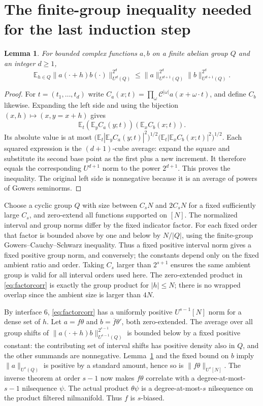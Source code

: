 \documentclass[11pt]{article}
\newtheorem{lemma}[theorem]{Lemma}
\newcommand{\E}{\mathbb E}
\begin{document}
\section{The finite-group inequality needed for the last induction step}

\begin{lemma}\label{lem:CS}
For bounded complex functions $a,b$ on a finite abelian group $Q$ and an
integer $d\geq1$,
\[
 \E_{h\in Q}\|a(\cdot+h)b(\cdot)\|_{U^d(Q)}^{2^d}
 \leq
 \|a\|_{U^{d+1}(Q)}^{2^d}
 \|b\|_{U^{d+1}(Q)}^{2^d}.
\]
\end{lemma}
\begin{proof}
For $t=(t_1,\ldots,t_d)$ write
$C_a(x;t)=\prod_\omega\mathcal C^{|\omega|}a(x+\omega\cdot t)$,
and define $C_b$ likewise. Expanding the left side and using the bijection
$(x,h)\mapsto(x,y=x+h)$ gives
\[
 \E_t(\E_y C_a(y;t))(\E_x C_b(x;t)).
\]
Its absolute value is at most
$\bigl(\E_t|\E_yC_a(y;t)|^2\bigr)^{1/2}
 \bigl(\E_t|\E_xC_b(x;t)|^2\bigr)^{1/2}$.
Each squared expression is the $(d+1)$-cube average: expand the square
and substitute its second base point as the first plus a new increment.
It therefore equals the corresponding $U^{d+1}$ norm to the power
$2^{d+1}$. This proves the inequality. The original left side is
nonnegative because it is an average of powers of Gowers seminorms.
\end{proof}

Choose a cyclic group $Q$ with size between $C_sN$ and $2C_sN$ for a fixed
sufficiently large $C_s$, and zero-extend all functions supported on $[N]$.
The normalized interval and group norms differ by the fixed indicator
factor. For each fixed order that factor is bounded above by one and below
by $N/|Q|$, using the finite-group Gowers--Cauchy--Schwarz inequality.
Thus a fixed positive interval norm gives a fixed positive group norm,
and conversely; the constants depend only on the fixed ambient ratio and
order. Taking $C_s$ larger than $2^{s+1}$ ensures the same ambient group
is valid for all interval orders used here. The zero-extended product in
\eqref{eq:factorcorr} is exactly the group product for $|h|\leq N$;
there is no wrapped overlap since the ambient size is larger than $4N$.

By interface 6, \eqref{eq:factorcorr} has a uniformly positive
$U^{s-1}[N]$ norm for a dense set of $h$. Let $a=f\theta$ and
$b=\overline f\theta'$, both zero-extended. The average over all group
shifts of $\|a(\cdot+h)b\|_{U^{s-1}(Q)}^{2^{s-1}}$ is bounded below by a
fixed positive constant: the contributing set of interval shifts has
positive density also in $Q$, and the other summands are nonnegative.
Lemma~\ref{lem:CS} and the fixed bound on $b$ imply
$\|a\|_{U^s(Q)}$ is positive by a standard amount, hence so is
$\|f\theta\|_{U^s[N]}$. The inverse theorem at order $s-1$ now makes
$f\theta$ correlate with a degree-at-most-$s-1$ nilsequence $\psi$.
The actual product $\theta\psi$ is a degree-at-most-$s$ nilsequence on
the product filtered nilmanifold. Thus $f$ is $s$-biased.
\end{document}
